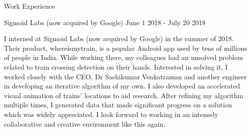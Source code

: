 \documentclass{resume} %
\begin{document}
\begin{rSection}{Work Experience}


\begin{rSubsection}{ Sigmoid Labs (now acquired by Google) }{ June 1 2018 - July 20 2018 }{}
\item I interned at Sigmoid Labs (now acquired by Google) in the summer of 2018. Their product, whereismytrain, is a popular Android app used by tens of millions of people in India. While working there, my colleagues had an unsolved problem related to train crossing detection on their hands. Interested in solving it, I worked closely with the CEO, Dr Sashikumar Venkatraman and another engineer in developing an iterative algorithm of my own. I also developed an accelerated visual animation of trains’ locations to aid research. After refining my algorithm multiple times, I generated data that made significant progress on a solution which was widely appreciated. I look forward to working in an intensely collaborative and creative environment like this again.

\end{rSubsection}


\end{rSection}
\end{document}
